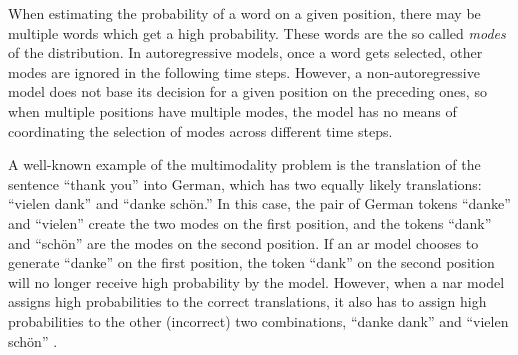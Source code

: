 When estimating the probability of a word on a given position, there may be
multiple words which get a high probability. These words are the so called
\emph{modes} of the distribution. In autoregressive models, once a word gets
selected, other modes are ignored in the following time steps. However, a
non-autoregressive model does not base its decision for a given position on the
preceding ones, so when multiple positions have multiple modes, the model has
no means of coordinating the selection of modes across different time steps.




A well-known example of the multimodality problem is the translation of the
sentence ``thank you'' into German, which has two equally likely translations:
``vielen dank'' and ``danke schön.'' In this case, the pair of German tokens
``danke'' and ``vielen'' create the two modes on the first position, and the
tokens ``dank'' and ``schön'' are the modes on the second position. If an
\acl{ar} model chooses to generate ``danke'' on the first position, the token
``dank'' on the second position will no longer receive high probability by the
model. However, when a \acl{nar} model assigns high probabilities to the
correct translations, it also has to assign high probabilities to the other
(incorrect) two combinations, ``danke dank'' and ``vielen schön''
\citep{gu2017nonautoregressive}.

